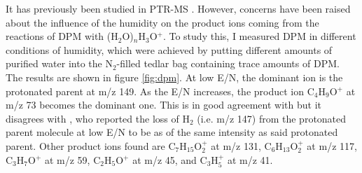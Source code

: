 It has previously been studied in PTR-MS \cite{etheses3839,doi:10.1002/rcm.4334}. However, concerns have been raised about the influence of the humidity on the product ions coming from the reactions of DPM with (H$_2$O)$_n$H$_3$O$^+$. To study this, I measured DPM in different conditions of humidity, which were achieved by putting different amounts of purified water into the N$_2$-filled tedlar bag containing trace amounts of DPM. 
The results are shown in figure \ref{fig:dpm}. At low E/N, the dominant ion is the protonated parent at m/z 149. As the E/N increases, the product ion C$_4$H$_9$O$^+$ at m/z 73 becomes the dominant one. 
This is in good agreement with  \citeauthor{etheses3839} \cite{etheses3839} but it disagrees with \citeauthor{doi:10.1002/rcm.4334} \cite{doi:10.1002/rcm.4334}, who reported the loss of H$_2$ (i.e. m/z 147) from the protonated parent molecule at low E/N to be as of the same intensity as said protonated parent.
Other product ions found are
C$_{7}$H$_{15}$O$_2^+$ at m/z 131, 
C$_{6}$H$_{13}$O$_2^+$ at m/z 117, 
C$_{3}$H$_{7}$O$^+$ at m/z 59, 
C$_{2}$H$_{5}$O$^+$ at m/z 45, and
C$_{3}$H$_{5}^+$ at m/z 41.






